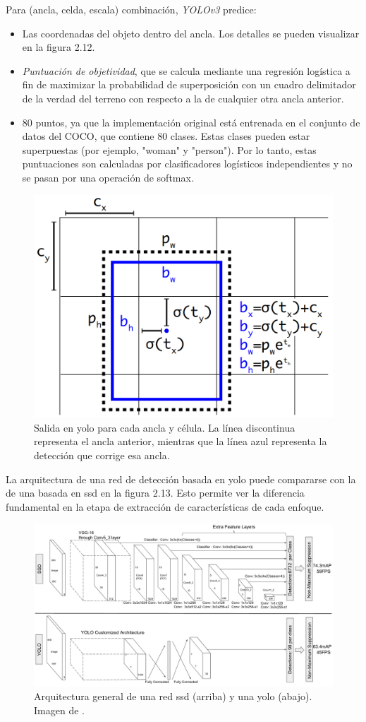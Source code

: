 Para (ancla, celda, escala) combinación, \textit{YOLOv3} predice:
\begin{itemize}
  \item Las coordenadas del objeto dentro del ancla. Los detalles se pueden visualizar en la figura 2.12.
  \item \textit{Puntuación de objetividad}, que se calcula mediante una regresión logística a fin de maximizar la probabilidad de superposición con un cuadro delimitador de la verdad del terreno con respecto a la de cualquier otra ancla anterior.
  \item 80 puntos, ya que la implementación original está entrenada en el conjunto de datos del COCO, que contiene 80 clases. Estas clases pueden estar superpuestas (por ejemplo, "woman" y "person"). Por lo tanto, estas puntuaciones son calculadas por clasificadores logísticos independientes y no se pasan por una operación de softmax.
\end{itemize}

\begin{figure}[H]
	\centering
	\includegraphics[width=0.5\linewidth]{figures/estado_arte/yolo_outputs.png}
	\caption{Salida en \acrshort{yolo} para cada ancla y célula. La línea discontinua representa el ancla anterior, mientras que la línea azul representa la detección que corrige esa ancla.}
	\label{fig:2_yolo_output}
\end{figure}

La arquitectura de una red de detección basada en \acrshort{yolo} puede compararse con la de una basada en \acrshort{ssd} en la figura 2.13. Esto permite ver la diferencia fundamental en la etapa de extracción de características de cada enfoque.

\begin{figure}[h]
	\centering
	\includegraphics[width=0.8\linewidth]{figures/estado_arte/arch_ssd_yolo.png}
	\caption{Arquitectura general de una red \acrshort{ssd} (arriba) y una \acrshort{yolo} (abajo). Imagen de \cite{ssd}.}
	\label{fig:2_arch_ssd_yolo}
\end{figure}

